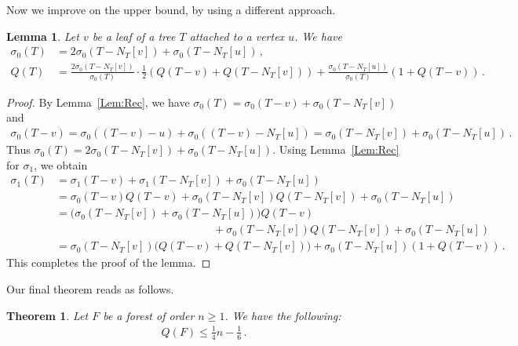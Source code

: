 \documentclass[a4paper,12pt]{amsart}
\newtheorem{thm}{Theorem}
\newtheorem{lem}{Lemma}
\begin{document}
\medskip
Now we improve on the upper bound, by using a different approach.

\begin{lem}\label{Lem:SimpleQ}
Let $v$ be a leaf of a tree $T$ attached to a vertex $u$. We have
\begin{align*}
  \sigma_0(T)&=2\sigma_0(T-N_T[v])+\sigma_0(T-N_T[u])\,,\\
    Q(T)&=\frac{2\sigma_0(T-N_T[v])}{\sigma_0(T)}\cdot \frac{1}{2} (Q(T-v)+Q(T-N_T[v])) + \frac{\sigma_0(T-N_T[u])}{\sigma_0(T)}(1+Q(T-v))\,.
\end{align*}
\end{lem}

\begin{proof}
By Lemma~\ref{Lem:Rec}, we have $\sigma_0(T)=\sigma_0(T-v)+\sigma_0(T-N_T[v])$ and 
\begin{align*}
    \sigma_0(T-v)=\sigma_0((T-v)-u)+\sigma_0((T-v)-N_T[u])=\sigma_0(T-N_T[v])+\sigma_0(T-N_T[u])\,.
\end{align*}
Thus $\sigma_0(T)=2\sigma_0(T-N_T[v])+\sigma_0(T-N_T[u])$. Using Lemma~\ref{Lem:Rec} for $\sigma_1$, we obtain
\begin{align*}
    \sigma_1(T) &= \sigma_1(T-v)+ \sigma_1(T-N_T[v])+\sigma_0(T-N_T[u]) \\
    &=\sigma_0(T-v) Q(T-v) +\sigma_0(T-N_T[v])Q(T-N_T[v])+\sigma_0(T-N_T[u]) \\
      &= \big( \sigma_0(T-N_T[v])+\sigma_0(T-N_T[u]) \big) Q(T-v)\\
      & \hspace{6cm} +\sigma_0(T-N_T[v])Q(T-N_T[v])+\sigma_0(T-N_T[u]) \\
     &=\sigma_0(T-N_T[v]) \big(Q(T-v)+Q(T-N_T[v]) \big) +\sigma_0(T-N_T[u]) (1+ Q(T-v))\,.
\end{align*}
This completes the proof of the lemma.
\end{proof}

\medskip
Our final theorem reads as follows.

\begin{thm}
Let $F$ be a forest of order $n\geq 1$. We have the following:
\begin{align*}
    Q(F)\leq \frac{1}{4}n - \frac{1}{6}\,.
\end{align*}
\end{thm}
\end{document}
